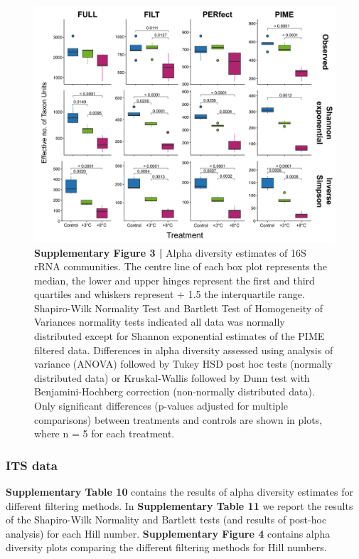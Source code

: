 \documentclass[
  10pt,
  letterpaper,
  DIV=11,
  numbers=noendperiod]{scrartcl}
\begin{document}
\begin{figure}

{\centering \includegraphics[width=1\textwidth,height=\textheight]{FIGURES/ssu_supp_alpha_div.png}

}

\caption{\textbf{Supplementary Figure 3 |} Alpha diversity estimates of
16S rRNA communities. The centre line of each box plot represents the
median, the lower and upper hinges represent the first and third
quartiles and whiskers represent + 1.5 the interquartile range.
Shapiro-Wilk Normality Test and Bartlett Test of Homogeneity of
Variances normality tests indicated all data was normally distributed
except for Shannon exponential estimates of the PIME filtered data.
Differences in alpha diversity assessed using analysis of variance
(ANOVA) followed by Tukey HSD post hoc tests (normally distributed data)
or Kruskal-Wallis followed by Dunn test with Benjamini-Hochberg
correction (non-normally distributed data). Only significant differences
(p-values adjusted for multiple comparisons) between treatments and
controls are shown in plots, where n = 5 for each treatment.}

\end{figure}

\newpage{}

\hypertarget{its-data-2}{%
\subsubsection{ITS data}\label{its-data-2}}

\textbf{Supplementary Table 10} contains the results of alpha diversity
estimates for different filtering methods. In \textbf{Supplementary
Table 11} we report the results of the Shapiro-Wilk Normality and
Bartlett tests (and results of post-hoc analysis) for each Hill number.
\textbf{Supplementary Figure 4} contains alpha diversity plots comparing
the different filtering methods for Hill numbers.
\end{document}
